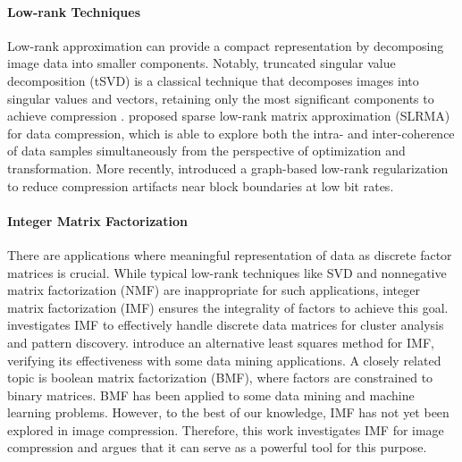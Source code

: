 \paragraph{Low-rank Techniques}
Low-rank approximation can provide a compact representation by decomposing image data into smaller components. Notably, truncated singular value decomposition (tSVD) is a classical technique that decomposes images into singular values and vectors, retaining only the most significant components to achieve compression \cite{andrews1976singular, prasantha2007image}. \textcite{hou2015sparse} proposed sparse low-rank matrix approximation (SLRMA) for data compression, which is able to explore both the intra- and inter-coherence of data samples simultaneously from the perspective of optimization and transformation.
More recently, \textcite{yuan2020image} introduced a graph-based low-rank regularization to reduce compression artifacts near block boundaries at low bit rates.

\paragraph{Integer Matrix Factorization}
There are applications where meaningful representation of data as discrete factor matrices is crucial. While typical low-rank techniques like SVD and nonnegative matrix factorization (NMF) are inappropriate for such applications, integer matrix factorization (IMF) ensures the integrality of factors to achieve this goal. \textcite{lin2005integer} investigates IMF to effectively handle discrete data matrices for cluster analysis and pattern discovery. \textcite{dong2018integer} introduce an alternative least squares method for IMF, verifying its effectiveness with some data mining applications. A closely related topic is boolean matrix factorization (BMF), where factors are constrained to binary matrices. BMF has been applied to some data mining \cite{miettinen2008discrete} and machine learning \cite{ravanbakhsh2016boolean} problems. However, to the best of our knowledge, IMF has not yet been explored in image compression. Therefore, this work investigates IMF for image compression and argues that it can serve as a powerful tool for this purpose.
